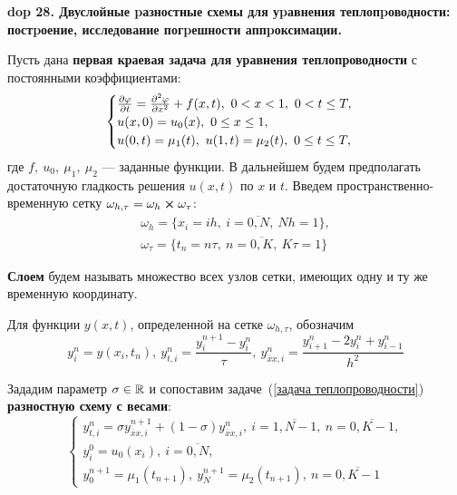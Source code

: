 \textbf{\LARGE dop 28. Двуслойные pазностные схемы для уpавнения теплопpоводности: постpоение, исследование погpешности аппpоксимации.}

\renewcommand{\theequation}{\arabic{equation}} 
\setcounter{equation}{0}

\newcommand{\ddev}[1]{#1_{\overline{x}x,i}}
\newcommand{\deln}[3]{\frac{\partial^{#3} #1}{\partial #2^{#3}}}

\begin{Commentwhite}
Пусть дана \textbf{первая краевая задача для уравнения теплопроводности} с постоянными коэффициентами:
\begin{equation}
    \label{задача теплопроводности}
    \begin{cases}
        \frac{\partial \varphi}{\partial t} = \frac{\partial^2 \varphi}{\partial x^2} + f(x, t),~0 < x < 1,~0 < t \le T,
        \\
        u(x, 0) = u_0(x),~0 \le x \le 1,
        \\
        u(0, t) = \mu_1(t),~u(1, t) = \mu_2(t),~0 \le t \le T,
    \end{cases}
\end{equation}
где $f,~u_0,~\mu_1,~\mu_2$ --- заданные функции. В дальнейшем будем предполагать достаточную гладкость решения $u(x,t)$ по $x$ и $t$. Введем пространственно-временную сетку $\omega_{h,\tau} = \omega_h \cross \omega_{\tau}$:
\begin{gather*}
    \omega_h = \{ x_i = ih,~i=\overline{0,N},~Nh = 1 \},
    \\
    \omega_\tau = \{ t_n = n\tau,~n=\overline{0,K},~K\tau = 1 \}
\end{gather*}

\begin{definition}
\textbf{Слоем} будем называть множество всех узлов сетки, имеющих одну и ту же временную координату.
\end{definition}

Для функции $y(x, t)$, определенной на сетке $\omega_{h,\tau}$, обозначим
$$y_i^n = y(x_i, t_n),~y_{t,i}^n = \frac{y_i^{n+1} - y_i^n}{\tau},~\ddev{y}^n = \frac{y_{i+1}^n - 2y_i^n + y_{i-1}^n}{h^2}$$

Зададим параметр $\sigma\in{\mathbb{R}}$ и сопоставим задаче~(\ref{задача теплопроводности}) \textbf{разностную схему с весами}:
\begin{equation}
    \label{двуслойная схема с весами}
    \begin{cases}
        y_{t,i}^n = \sigma \ddev{y}^{n+1} + (1 - \sigma)\ddev{y}^n,~i=\overline{1,N-1},~n=\overline{0,K-1},
        \\
        y_i^0 = u_0(x_i),~i=\overline{0,N},
        \\
        y_0^{n+1} = \mu_1(t_{n+1}),~y_N^{n+1} = \mu_2(t_{n+1}),~n=\overline{0,K-1}
    \end{cases}
\end{equation}


\end{Commentwhite}

